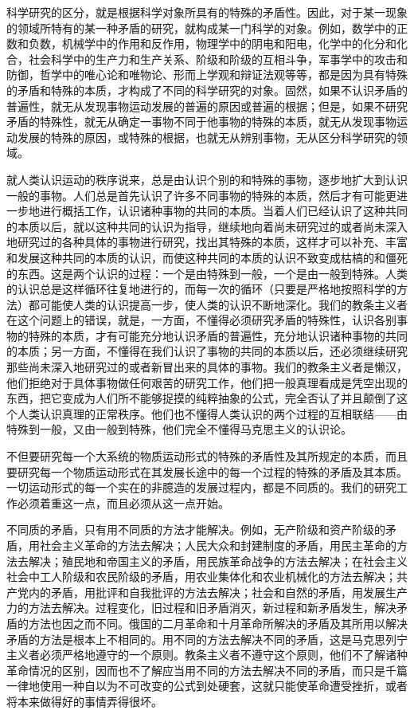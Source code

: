 \documentclass[UTF8, 12pt, a4paper]{ctexrep}
\begin{document}
科学研究的区分，就是根据科学对象所具有的特殊的矛盾性。因此，对于某一现象的领域所特有的某一种矛盾的研究，就构成某一门科学的对象。例如，数学中的正数和负数，机械学中的作用和反作用，物理学中的阴电和阳电，化学中的化分和化合，社会科学中的生产力和生产关系、阶级和阶级的互相斗争，军事学中的攻击和防御，哲学中的唯心论和唯物论、形而上学观和辩证法观等等，都是因为具有特殊的矛盾和特殊的本质，才构成了不同的科学研究的对象。固然，如果不认识矛盾的普遍性，就无从发现事物运动发展的普遍的原因或普遍的根据；但是，如果不研究矛盾的特殊性，就无从确定一事物不同于他事物的特殊的本质，就无从发现事物运动发展的特殊的原因，或特殊的根据，也就无从辨别事物，无从区分科学研究的领域。

就人类认识运动的秩序说来，总是由认识个别的和特殊的事物，逐步地扩大到认识一般的事物。人们总是首先认识了许多不同事物的特殊的本质，然后才有可能更进一步地进行概括工作，认识诸种事物的共同的本质。当着人们已经认识了这种共同的本质以后，就以这种共同的认识为指导，继续地向着尚未研究过的或者尚未深入地研究过的各种具体的事物进行研究，找出其特殊的本质，这样才可以补充、丰富和发展这种共同的本质的认识，而使这种共同的本质的认识不致变成枯槁的和僵死的东西。这是两个认识的过程：一个是由特殊到一般，一个是由一般到特殊。人类的认识总是这样循环往复地进行的，而每一次的循环（只要是严格地按照科学的方法）都可能使人类的认识提高一步，使人类的认识不断地深化。我们的教条主义者在这个问题上的错误，就是，一方面，不懂得必须研究矛盾的特殊性，认识各别事物的特殊的本质，才有可能充分地认识矛盾的普遍性，充分地认识诸种事物的共同的本质；另一方面，不懂得在我们认识了事物的共同的本质以后，还必须继续研究那些尚未深入地研究过的或者新冒出来的具体的事物。我们的教条主义者是懒汉，他们拒绝对于具体事物做任何艰苦的研究工作，他们把一般真理看成是凭空出现的东西，把它变成为人们所不能够捉摸的纯粹抽象的公式，完全否认了并且颠倒了这个人类认识真理的正常秩序。他们也不懂得人类认识的两个过程的互相联结——由特殊到一般，又由一般到特殊，他们完全不懂得马克思主义的认识论。

不但要研究每一个大系统的物质运动形式的特殊的矛盾性及其所规定的本质，而且要研究每一个物质运动形式在其发展长途中的每一个过程的特殊的矛盾及其本质。一切运动形式的每一个实在的非臆造的发展过程内，都是不同质的。我们的研究工作必须着重这一点，而且必须从这一点开始。

不同质的矛盾，只有用不同质的方法才能解决。例如，无产阶级和资产阶级的矛盾，用社会主义革命的方法去解决；人民大众和封建制度的矛盾，用民主革命的方法去解决；殖民地和帝国主义的矛盾，用民族革命战争的方法去解决；在社会主义社会中工人阶级和农民阶级的矛盾，用农业集体化和农业机械化的方法去解决；共产党内的矛盾，用批评和自我批评的方法去解决；社会和自然的矛盾，用发展生产力的方法去解决。过程变化，旧过程和旧矛盾消灭，新过程和新矛盾发生，解决矛盾的方法也因之而不同。俄国的二月革命和十月革命所解决的矛盾及其所用以解决矛盾的方法是根本上不相同的。用不同的方法去解决不同的矛盾，这是马克思列宁主义者必须严格地遵守的一个原则。教条主义者不遵守这个原则，他们不了解诸种革命情况的区别，因而也不了解应当用不同的方法去解决不同的矛盾，而只是千篇一律地使用一种自以为不可改变的公式到处硬套，这就只能使革命遭受挫折，或者将本来做得好的事情弄得很坏。
\end{document}
